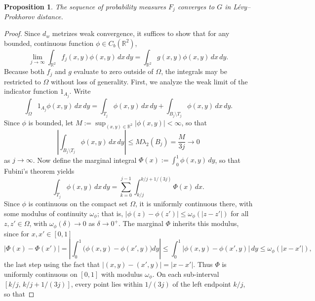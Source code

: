\documentclass[12pt]{article}
\newtheorem{proposition}{Proposition}
\newcommand{\RR}{\mathbb{R}}
\begin{document}
\begin{proposition}\label{prop:weak}
The sequence of probability measures $F_j$ converges to $G$ in L\'evy--Prokhorov distance.
\end{proposition}
\begin{proof}
Since $d_{w}$ metrizes weak convergence, it suffices to show that for any bounded, continuous function $\phi \in C_b(\RR^2)$,
\begin{equation*}
    \lim_{j \to \infty} \int_{\RR^2} f_j(x,y) \phi(x,y) \, dx \, dy = \int_{\RR^2} g(x,y)\phi(x,y) \, dx \, dy.
\end{equation*}
Because both $f_j$ and $g$ evaluate to zero outside of $\Omega$, the integrals may be restricted
to $\Omega$ without loss of generality. First, we analyze the weak limit of the indicator function $1_{A_j}$. Write
\begin{equation*}
    \int_\Omega 1_{A_j} \phi(x,y) \, dx \, dy = \int_{T_j} \phi(x,y) \, dx \, dy + \int_{B_j \setminus T_j} \phi(x,y) \, dx \, dy.
\end{equation*}
Since $\phi$ is bounded, let $M := \sup_{(x,y)\in\RR^2} |\phi(x,y)|<\infty$, so that
\begin{equation*}
    \left| \int_{B_j \setminus T_j} \phi(x,y) \, dx \, dy \right| \leq M \lambda_2(B_j) = \frac{M}{3j} \to 0
\end{equation*}
as $j\to\infty$. Now define the marginal integral $\Phi(x) := \int_0^1 \phi(x,y) \, dy$, so that Fubini's theorem yields
\begin{equation*}
    \int_{T_j} \phi(x,y) \, dx \, dy = \sum_{k=0}^{j-1} \int_{k/j}^{k/j + 1/(3j)} \Phi(x) \, dx.
\end{equation*}
Since $\phi$ is continuous on the compact set $\Omega$, it is uniformly continuous
there, with some modulus of continuity $\omega_\phi$; that is, $|\phi(z) - \phi(z')| \leq
\omega_\phi(|z - z'|)$ for all $z, z' \in \Omega$, with $\omega_\phi(\delta) \to 0$ as
$\delta \to 0^+$. The marginal $\Phi$ inherits this modulus, since for $x, x' \in [0,1]$
\begin{equation*}
    |\Phi(x) - \Phi(x')|
    = \left| \int_0^1 \bigl( \phi(x,y) - \phi(x',y) \bigr) dy \right|
    \leq \int_0^1 \bigl| \phi(x,y) - \phi(x',y) \bigr| \, dy
    \leq \omega_\phi(|x - x'|),
\end{equation*}
the last step using the fact that $|(x,y) - (x',y)| = |x - x'|$. Thus $\Phi$ is uniformly continuous on $[0,1]$
with modulus $\omega_\phi$. On each sub-interval $[k/j,\, k/j + 1/(3j)]$, every point lies within
$1/(3j)$ of the left endpoint $k/j$, so that

\end{proof}
\end{document}
